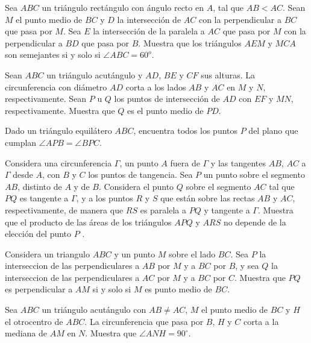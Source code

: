 \documentclass[11pt]{scrartcl}
\begin{document}
\begin{problem} [2006/2] 
    Sea $ABC$ un triángulo rectángulo con ángulo recto en $A$, tal que $AB\lt AC$. Sean $M$ el punto medio de $BC$ y $D$ la intersección de $AC$ con la perpendicular a $BC$ que pasa por $M$. Sea $E$ la intersección de la paralela a $AC$ que pasa por $M$ con la perpendicular a $BD$ que pasa por $B$. Muestra que los triángulos $AEM$ y $MCA$ son semejantes si y solo si $\angle ABC=60^o$.
    \end{problem}
\begin{problem} [2006/5] 
    Sean $ABC$ un triángulo acutángulo y $AD$, $BE$ y $CF$ sus alturas. La circunferencia con diámetro $AD$ corta a los lados $AB$ y $AC$ en $M$ y $N$, respectivamente. Sean $P$ u $Q$ los puntos de intersección de $AD$ con $EF$ y $MN$, respectivamente. Muestra que $Q$ es el punto medio de $PD$.
    \end{problem}
\begin{problem} [2007/2] 
    Dado un triángulo equilátero $ABC$, encuentra todos los puntos $P$ del plano que cumplan $\angle APB=\angle BPC$.
    \end{problem}

 \begin{problem} [2008/2] 
    Considera una circunferencia $\Gamma$, un punto $A$ fuera de $\Gamma$ y las tangentes $AB$, $AC$ a $\Gamma$ desde
$A$, con $B$ y $C$ los puntos de tangencia. Sea $P$ un punto sobre el segmento $AB$, distinto de
$A$ y de $B$. Considera el punto $Q$ sobre el segmento $AC$ tal que $P Q$ es tangente a $\Gamma$, y a los
puntos $R$ y $S$ que están sobre las rectas $AB$ y $AC$, respectivamente, de manera que $RS$
es paralela a $P Q$ y tangente a $\Gamma$. Muestra que el producto de las áreas de los triángulos
$APQ$ y $ARS$ no depende de la elección del punto $P$ .
    \end{problem}
 
\begin{problem}
[2009/5] Considera un triangulo $ABC$ y un punto $M$ sobre el lado $BC$. Sea $P$ la interseccion de las perpendiculares a $AB$ por $M$ y a $BC$ por $B$, y sea $Q$ la interseccion de las perpendiculares a $AC$ por $M$ y a $BC$ por $C$. Muestra que $PQ$ es perpendicular a $AM$ si y solo si $M$ es punto medio de $BC$. 
\end{problem}

\begin{problem}
[2010/5]Sea $ABC$ un triángulo acutángulo con $AB \neq AC$, $M$ el punto medio de $BC$ y $H$ el otrocentro de $ABC$. La circunferencia que pasa por $B$, $H$ y $C$ corta a la mediana de $AM$ en $N$. Muestra que $\angle ANH = 90^{\circ}$.
\end{problem}
\end{document}
